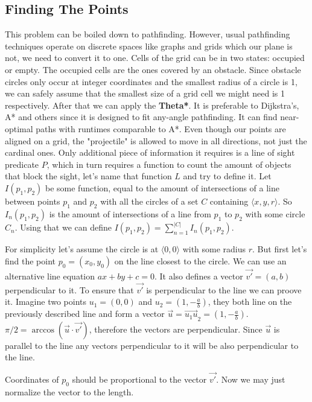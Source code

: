 \documentclass[12pt, titlepage]{article}
\begin{document}
\subsection{Finding The Points}
This problem can be boiled down to pathfinding. However, usual pathfinding
techniques operate on discrete spaces like graphs and grids which our plane
is not, we need to convert it to one. Cells of the grid can be in two states:
occupied or empty. The occupied cells are the ones covered by an obstacle. 
Since obstacle circles only occur at integer coordinates and the smallest
radius of a circle is 1, we can safely assume that the smallest size of a grid
cell we might need is 1 respectively. After that we can apply the \textbf{Theta*}.
It is preferable to Dijkstra's, A* and others since it is designed to fit
any-angle pathfinding. It can find near-optimal paths with runtimes comparable
to A*. Even though our points are aligned on a grid,
the "projectile" is allowed to move in all directions, not just the cardinal ones. 
Only additional piece of information it requires is a line of sight predicate $P$,
which in turn requires a function to count the amount of objects that block the
sight, let's name that function $L$ and try to define it.
Let $I(p_1, p_2)$ be some function, equal to the amount of intersections of a 
line between points $p_1$ and $p_2$  with all the circles of a set $C$ containing 
$\langle x, y, r \rangle$. So $I_n(p_1, p_2)$ is the amount of intersections
of a line from $p_1$ to $p_2$ with some circle $C_n$. 
Using that we can define $I(p_1, p_2) = \sum_{n=1}^{|C|}I_n(p_1, p_2)$.

For simplicity let's assume the circle is at $\langle 0, 0 \rangle$ with
some radius $r$.
But first let's find the point $p_0 = (x_0, y_0)$ on the line closest to the circle.
We can use an alternative line equation $ax + by + c = 0$.
It also defines a vector $\vec{v'} = (a, b)$ perpendicular to it.
To ensure that $\vec{v'}$ is perpendicular to the line we can proove it.
Imagine two points $u_1 = (0, 0)$ and $u_2 = (1, -\frac{a}{b})$, they
both line on the previously described line and form a
vector $\vec{u} = \vec{u_1u}_2 = (1, -\frac{a}{b})$. $\pi/2 = \arccos(\vec{u} \cdot \vec{v'})$,
therefore the vectors are perpendicular. Since $\vec{u}$ is parallel to the line
any vectors perpendicular to it will be also perpendicular to the line.

Coordinates of $p_0$ should be proportional to the vector $\vec{v'}$. 
Now we may just normalize the vector to the length.
\end{document}
